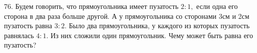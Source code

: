 76. Будем говорить, что прямоугольника имеет пузатость $2:1,$ если одна его сторона в два раза больше другой. А у прямоугольника со сторонами 3см и 2см пузатость равна $3:2.$ Было два прямоугольника, у каждого из которых пузатость равнялась $4:1.$ Из них сложили один прямоугольник. Чему может быть равна его пузатость?\\
